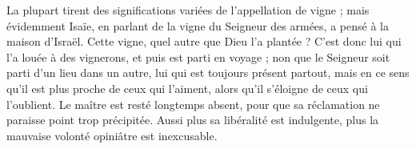 La plupart tirent des significations variées de l’appellation de vigne ; mais évidemment Isaïe, en parlant de la vigne du Seigneur des armées, a pensé à la maison d’Israël. Cette vigne, quel autre que Dieu l’a plantée ? C’est donc lui qui l’a louée à des vignerons, et puis est parti en voyage ; non que le Seigneur soit parti d’un lieu dans un autre, lui qui est toujours présent partout, mais en ce sens qu’il est plus proche de ceux qui l’aiment, alors qu’il s’éloigne de ceux qui l’oublient. Le maître est resté longtemps absent, pour que sa réclamation ne paraisse point trop précipitée. Aussi plus sa libéralité est indulgente, plus la mauvaise volonté opiniâtre est inexcusable.
